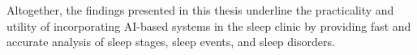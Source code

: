 
\bigskip

Altogether, the findings presented in this thesis underline the practicality and utility of incorporating \ac{AI}-based systems in the sleep clinic by providing fast and accurate analysis of sleep stages, sleep events, and sleep disorders.


